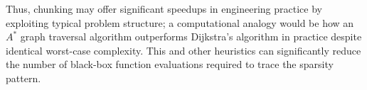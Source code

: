 Thus, chunking may offer significant speedups in engineering practice by exploiting typical problem structure; a computational analogy would be how an $A^*$ graph traversal algorithm outperforms Dijkstra's algorithm in practice despite identical worst-case complexity. This and other heuristics can significantly reduce the number of black-box function evaluations required to trace the sparsity pattern.
